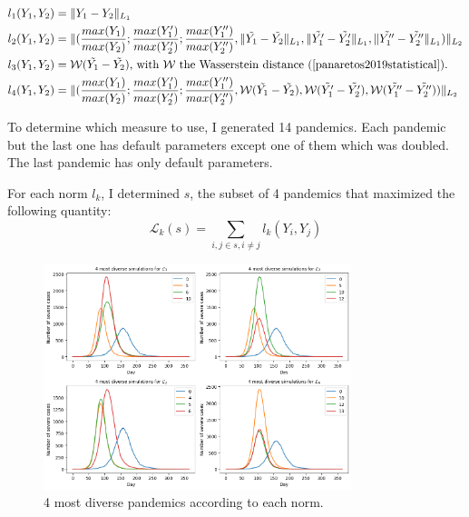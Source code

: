 $
\begin{aligned}
    &{l }_1(Y_1, Y_2) = \| Y_1 - Y_2 \|_{L_1}  \\
    &{l}_2(Y_1, Y_2) = \| (\frac{max(Y_1)}{max(Y_2)} ;\frac{max(Y_1')}{max(Y_2')} ; \frac{max(Y_1'')}{max(Y_2'')} , \| \tilde{Y_1} - \tilde{Y_2} \|_{L_1}, \| \tilde{Y_1'} - \tilde{Y_2'} \|_{L_1} , \| \tilde{Y_1''} - \tilde{Y_2''} \|_{L_1}) \|_{L_2} \\
    &{l}_3(Y_1, Y_2) = \mathcal{W}(\tilde{Y_1} - \tilde{Y_2}) \text{, with }\mathcal{W} \text{ the Wasserstein distance (\cite{panaretos2019statistical}).} \\
    &{l}_4(Y_1, Y_2) = \| (\frac{max(Y_1)}{max(Y_2)} ;\frac{max(Y_1')}{max(Y_2')} ; \frac{max(Y_1'')}{max(Y_2'')} , \mathcal{W} (\tilde{Y_1} - \tilde{Y_2}),\mathcal{W} (\tilde{Y_1'} - \tilde{Y_2'}) , \mathcal{W} (\tilde{Y_1''} - \tilde{Y_2''})) \|_{L_2} \\
\end{aligned}
$


To determine which measure to use, I generated 14 pandemics. 
Each pandemic but the last one has default parameters except one of them which was doubled. 
The last pandemic has only default parameters. 

For each norm $l_k$, I determined $s$,  the subset of 4 pandemics that maximized the following quantity:\\

\[ \mathcal{L}_k(s) = \sum_{i, j \in s, i \neq j} {l}_k(Y_i, Y_j) \]

\begin{figure}[h!]
    \centering
    \includegraphics[width=0.8\textwidth]{figures/most_different_pandemics.png}
    \caption{4 most diverse pandemics according to each norm.}
    \label{fig:diversity_pandemics}
\end{figure}


